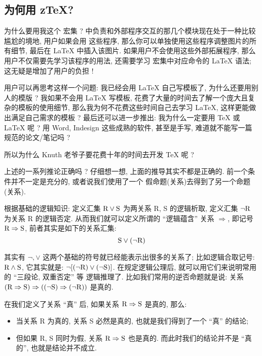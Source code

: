 \documentclass[
  hyper, lang=cn,
  mathSpec={envStyle=leftbar},
]{../../zlatex/code/ztex}
\def\lrr#1{\ensuremath{\Rightarrow}}
\begin{document}
\subsection{为何用 z\TeX{}?}
为什么要用我这个 \ztex{} 宏集 ? \zTikZ{} 中负责和外部程序交互的那几个模块现在处于一种比较尴尬的境地, 用户如果会用
这些程序, 那么你可以单独使用这些程序调整图片的所有细节, 最后在 \LaTeX{} 中插入该图片. 如果用户不会使用这些外部拓展程序,
那么用户不仅需要先学习该程序的用法, 还需要学习 \zTikZ{} 宏集中对应命令的 \LaTeX{} 语法; 这无疑是增加了用户的负担 !

用户可以再思考这样一个问题: 我已经会用 \LaTeX{} 自己写模板了, 为什么还要用别人的模版 ? 我如果不会用 \LaTeX{} 写模板,
花费了大量的时间去了解一个庞大且复杂的模板的使用细节, 那么我为何不花费这些时间自己去学习 \LaTeX{}, 这样更能做出满足自己需求的模板 ? 
最后还可以进一步推出: 我为什么一定要用 \TeX{} 或 \LaTeX{} 呢 ? 用 Word, Indesign 这些成熟的软件, 甚至是手写, 难道就不能写一篇
规范的论文/笔记吗 ? 

所以为什么 Knuth 老爷子要花费十年的时间去开发 \TeX{} 呢 ? 

上述的一系列推论正确吗 ? 仔细想一想, 上面的推导其实不都是正确的. 前一个条件并不一定是充分的, 或者说我们使用了一个
假命题(关系)去得到了另一个命题(关系). 

根据基础的逻辑知识: 定义汇集 $\text R \vee \text S$ 为两关系 R, S 的逻辑析取, 定义汇集 $\lnot \text R$ 为关系 R 的逻辑否定. 
从而我们就可以定义所谓的 ``逻辑蕴含'' 关系 $\lrr{}$, 即记号 $\text R\lrr{} \text S$, 前者其实是如下的关系汇集:
\[
  \text S \vee (\lnot \text R)
\]

\begin{remark}
其实有 $\lnot, \vee$ 这两个基础的符号就已经能表示出很多的关系了; 比如逻辑合取记号: $\text R\wedge \text S$, 它其实就是:
$ \lnot [(\lnot \text R)\vee (\lnot \text S)]$. 在规定逻辑公理后, 就可以用它们来说明常用的 ``三段论, 双重否定'' 等
逻辑推理了. 比如我们常用的逆否命题就是说: 关系 $(\text R\lrr{}\text S) \lrr{} ((\lnot\text S)\lrr{}(\lnot\text R))$
是真的.
\end{remark}

在我们定义了关系 ``真'' 后, 如果关系 $\text R\lrr{}\text S$ 是真的, 那么:
\begin{itemize}
  \item 当关系 R 为真的, 关系 S 必然是真的, 也就是我们得到了一个 ``真'' 的结论;
  \item 但如果 R, S 同时为假, 关系 $\text R\lrr{}\text S$ 也是真的. 而此时我们的结论并不是 ``真的'', 
    也就是结论并不成立.
\end{itemize}
\end{document}
